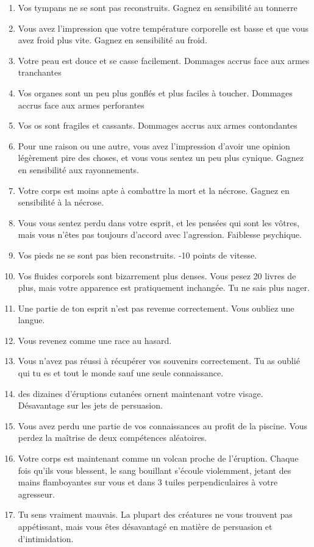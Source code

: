 \documentclass{article}
\begin{document}
\begin{enumerate}
	\item Vos tympans ne se sont pas reconstruits. Gagnez en sensibilité au tonnerre
	\item Vous avez l'impression que votre température corporelle est basse et que vous avez froid plus vite. Gagnez en sensibilité au froid. 
	\item Votre peau est douce et se casse facilement. Dommages accrus face aux armes tranchantes
	\item Vos organes sont un peu plus gonflés et plus faciles à toucher. Dommages accrus face aux armes perforantes
	\item Vos os sont fragiles et cassants. Dommages accrus aux armes contondantes
	\item Pour une raison ou une autre, vous avez l'impression d'avoir une opinion légèrement pire des choses, et vous vous sentez un peu plus cynique. Gagnez en sensibilité aux rayonnements.
	\item Votre corps est moins apte à combattre la mort et la nécrose. Gagnez en sensibilité à la nécrose.
	\item Vous vous sentez perdu dans votre esprit, et les pensées qui sont les vôtres, mais vous n'êtes pas toujours d'accord avec l'agression. Faiblesse psychique.
	\item Vos pieds ne se sont pas bien reconstruits. -10 points de vitesse. 
	\item Vos fluides corporels sont bizarrement plus denses. Vous pesez 20 livres de plus, mais votre apparence est pratiquement inchangée. Tu ne sais plus nager.
	\item Une partie de ton esprit n'est pas revenue correctement. Vous oubliez une langue.
	\item Vous revenez comme une race au hasard.
	\item Vous n'avez pas réussi à récupérer vos souvenirs correctement. Tu as oublié qui tu es et tout le monde sauf une seule connaissance.
	\item des dizaines d'éruptions cutanées ornent maintenant votre visage. Désavantage sur les jets de persuasion.
	\item Vous avez perdu une partie de vos connaissances au profit de la piscine. Vous perdez la maîtrise de deux compétences aléatoires.
	\item Votre corps est maintenant comme un volcan proche de l'éruption. Chaque fois qu'ils vous blessent, le sang bouillant s'écoule violemment, jetant des mains flamboyantes sur vous et dans 3 tuiles perpendiculaires à votre agresseur.
	\item Tu sens vraiment mauvais. La plupart des créatures ne vous trouvent pas appétissant, mais vous êtes désavantagé en matière de persuasion et d'intimidation.
\end{enumerate}
\end{document}
